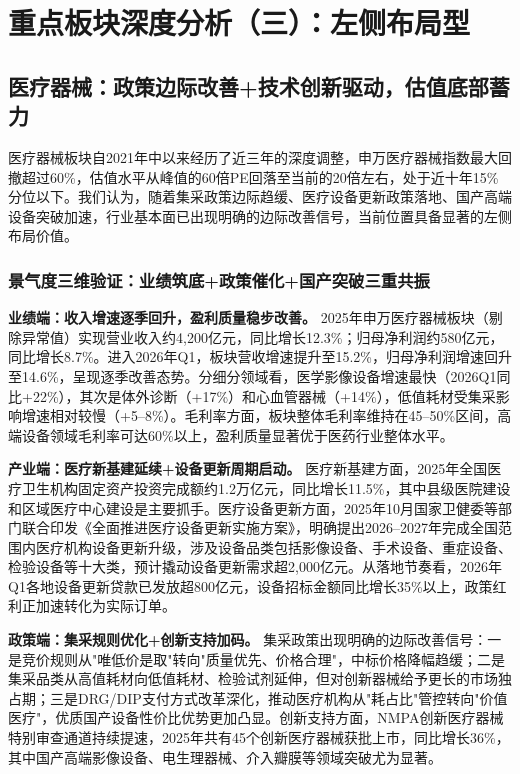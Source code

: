
\chapter{重点板块深度分析（三）：左侧布局型}

\section{医疗器械：政策边际改善+技术创新驱动，估值底部蓄力}

医疗器械板块自2021年中以来经历了近三年的深度调整，申万医疗器械指数最大回撤超过60\%，估值水平从峰值的60倍PE回落至当前的20倍左右，处于近十年15\%分位以下。我们认为，随着集采政策边际趋缓、医疗设备更新政策落地、国产高端设备突破加速，行业基本面已出现明确的边际改善信号，当前位置具备显著的左侧布局价值。

\subsection{景气度三维验证：业绩筑底+政策催化+国产突破三重共振}

\textbf{业绩端：收入增速逐季回升，盈利质量稳步改善。} 2025年申万医疗器械板块（剔除异常值）实现营业收入约4,200亿元，同比增长12.3\%；归母净利润约580亿元，同比增长8.7\%。进入2026年Q1，板块营收增速提升至15.2\%，归母净利润增速回升至14.6\%，呈现逐季改善态势。分细分领域看，医学影像设备增速最快（2026Q1同比+22\%），其次是体外诊断（+17\%）和心血管器械（+14\%），低值耗材受集采影响增速相对较慢（+5--8\%）。毛利率方面，板块整体毛利率维持在45--50\%区间，高端设备领域毛利率可达60\%以上，盈利质量显著优于医药行业整体水平。

\textbf{产业端：医疗新基建延续+设备更新周期启动。} 医疗新基建方面，2025年全国医疗卫生机构固定资产投资完成额约1.2万亿元，同比增长11.5\%，其中县级医院建设和区域医疗中心建设是主要抓手。医疗设备更新方面，2025年10月国家卫健委等部门联合印发《全面推进医疗设备更新实施方案》，明确提出2026--2027年完成全国范围内医疗机构设备更新升级，涉及设备品类包括影像设备、手术设备、重症设备、检验设备等十大类，预计撬动设备更新需求超2,000亿元。从落地节奏看，2026年Q1各地设备更新贷款已发放超800亿元，设备招标金额同比增长35\%以上，政策红利正加速转化为实际订单。

\textbf{政策端：集采规则优化+创新支持加码。} 集采政策出现明确的边际改善信号：一是竞价规则从"唯低价是取"转向"质量优先、价格合理"，中标价格降幅趋缓；二是集采品类从高值耗材向低值耗材、检验试剂延伸，但对创新器械给予更长的市场独占期；三是DRG/DIP支付方式改革深化，推动医疗机构从"耗占比"管控转向"价值医疗"，优质国产设备性价比优势更加凸显。创新支持方面，NMPA创新医疗器械特别审查通道持续提速，2025年共有45个创新医疗器械获批上市，同比增长36\%，其中国产高端影像设备、电生理器械、介入瓣膜等领域突破尤为显著。


